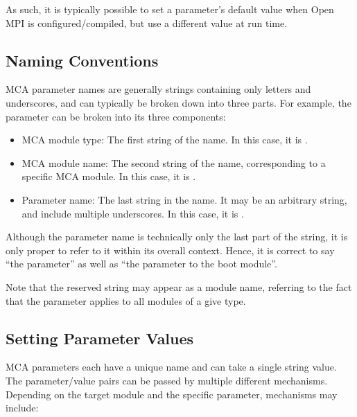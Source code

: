 As such, it is typically possible to set a parameter's default value
when Open MPI is configured/compiled, but use a different value at run
time.


\subsection{Naming Conventions}

MCA parameter names are generally strings containing only letters and
underscores, and can typically be broken down into three parts.  For
example, the parameter  can be broken
into its three components:

\begin{itemize}
\item MCA module type: The first string of the name.  In this case, it
  is .

\item MCA module name: The second string of the name, corresponding to
  a specific MCA module.  In this case, it is .
  
\item Parameter name: The last string in the name.  It may be an
  arbitrary string, and include multiple underscores.  In this case,
  it is .
\end{itemize}

Although the parameter name is technically only the last part of the
string, it is only proper to refer to it within its overall context.
Hence, it is correct to say ``the 
parameter'' as well as ``the  parameter to the
 boot module''.

Note that the reserved string  may appear as a module
name, referring to the fact that the parameter applies to all modules
of a give type.


\subsection{Setting Parameter Values}

MCA parameters each have a unique name and can take a single string
value.  The parameter/value pairs can be passed by multiple different
mechanisms.  Depending on the target module and the specific
parameter, mechanisms may include:

